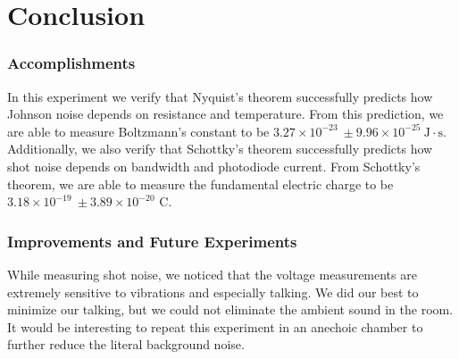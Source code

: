 \documentclass[12pt]{article}
\begin{document}
	\section{Conclusion}
	
	\subsubsection*{Accomplishments}
	In this experiment we verify that Nyquist's theorem successfully predicts how Johnson noise depends on resistance and temperature. From this prediction, we are able to measure Boltzmann's constant to be $3.27\times 10^{-23} \ \pm 9.96 \times 10^{-25} \ \text{J}\cdot \text{s}$. Additionally, we also verify that Schottky's theorem successfully predicts how shot noise depends on bandwidth and photodiode current. From Schottky's theorem, we are able to measure the fundamental electric charge to be $3.18\times 10^{-19} \ \pm 3.89 \times 10^{-20}$ C.
	
	\subsubsection*{Improvements and Future Experiments}
	While measuring shot noise, we noticed that the voltage measurements are extremely sensitive to vibrations and especially talking. We did our best to minimize our talking, but we could not eliminate the ambient sound in the room. It would be interesting to repeat this experiment in an anechoic chamber to further reduce the literal background noise. 
	
	
	
	
	\pagebreak
	

	
	\pagebreak
	
	
	\nocite{*}

	
\end{document}
